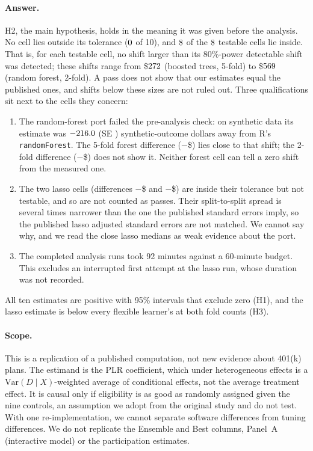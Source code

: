 \documentclass[11pt]{article}
\def\absvalaux-#1\relax{#1}
\newcommand{\absval}[1]{\expandafter\absvalaux#1\relax}
\newcommand{\negusd}[1]{$-$\$\absval{#1}}
\newcommand{\var}[1]{\texttt{#1}}
\begin{document}
\paragraph{Answer.} H2, the main hypothesis, holds in the meaning it was given before the
analysis. No cell lies outside its tolerance ($0$ of 10), and
$8$ of the $8$ testable cells lie inside. That is,
for each testable cell, no shift larger than its 80\%-power detectable shift was
detected; these shifts range from \$$272$ (boosted trees, 5-fold) to
\$$569$ (random forest, 2-fold). A pass does not show that our estimates
equal the published ones, and shifts below these sizes are not ruled out. Three
qualifications sit next to the cells they concern:
\begin{enumerate}
  \item The random-forest port failed the pre-analysis check: on synthetic data its
        estimate was $-216.0$ (SE \PortShiftSeForest) synthetic-outcome dollars
        away from R's \var{randomForest}. The 5-fold forest difference
        (\negusd{\DiffForestFive}) lies close to that shift; the 2-fold difference
        (\negusd{\DiffForestTwo}) does not show it. Neither forest cell can tell a zero
        shift from the measured one.
  \item The two lasso cells (differences \negusd{\DiffLassoTwo} and \negusd{\DiffLassoFive})
        are inside their tolerance but not testable, and so are not counted as passes.
        Their split-to-split spread is several times narrower than the one the
        published standard errors imply, so the published lasso adjusted standard errors
        are not matched. We cannot
        say why, and we read the close lasso medians as weak evidence about the port.
  \item The completed analysis runs took 92 minutes against a 60-minute budget. This
        excludes an interrupted first attempt at the lasso run, whose duration was not
        recorded.
\end{enumerate}
All ten estimates are positive with 95\% intervals that exclude zero (H1), and the lasso
estimate is below every flexible learner's at both fold counts (H3).

\paragraph{Scope.} This is a replication of a published computation, not new evidence
about 401(k) plans. The estimand is the PLR coefficient, which under heterogeneous
effects is a $\mathrm{Var}(D \mid X)$-weighted average of conditional effects, not the
average treatment effect. It is causal only if eligibility is as good as randomly
assigned given the nine controls, an assumption we adopt from the original study and
do not test. With one re-implementation, we cannot separate software differences from
tuning differences. We do not replicate the Ensemble and Best columns, Panel~A
(interactive model) or the participation estimates.
\end{document}
